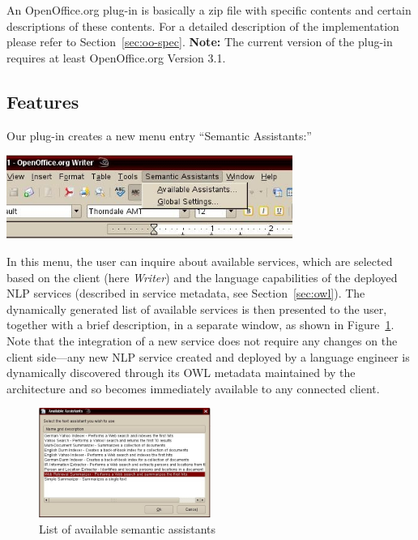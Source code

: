 An OpenOffice.org plug-in is basically a zip file with specific
contents and certain descriptions of these contents.  For a detailed
description of the implementation please refer to
Section~\ref{sec:oo-spec}. \textbf{Note:} The current version of the
plug-in requires at least OpenOffice.org Version 3.1.


\subsection{Features}
Our plug-in creates a new menu entry ``Semantic Assistants:''
\begin{center}
\includegraphics[width=0.7\textwidth]{pictures/oomenu.jpg}
\end{center}

In this menu, the user can inquire about available services, which are
selected based on the client (here \emph{Writer}) and the language
capabilities of the deployed NLP services (described in service
metadata, see Section~\ref{sec:owl}). The dynamically generated list
of available services is then presented to the user, together with a
brief description, in a separate window, as shown in
Figure~\ref{fig:oolist}. Note that the integration of a new service
does not require any changes on the client side---any new NLP service
created and deployed by a language engineer is dynamically discovered
through its OWL metadata maintained by the architecture and so becomes
immediately available to any connected client.
\begin{figure}[htb]
  \centering
  \includegraphics[width=0.5\textwidth]{pictures/oolist.jpg}
  \caption{List of available semantic assistants}
  \label{fig:oolist}
\end{figure}

